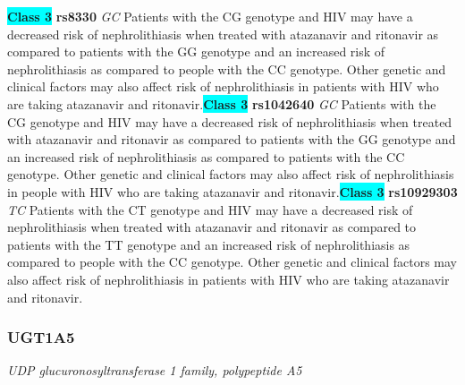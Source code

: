 \documentclass{report}
\begin{document}
\textbf{\colorbox{cyan} {Class 3}} \textbf{ rs8330 } \textit{ GC }
Patients with the CG genotype and HIV may have a decreased risk of nephrolithiasis when treated with atazanavir and ritonavir as compared to patients with the GG genotype and an increased risk of nephrolithiasis as compared to people with the CC genotype. Other genetic and clinical factors may also affect risk of nephrolithiasis in patients with HIV who are taking atazanavir and ritonavir.\newline\textbf{\colorbox{cyan} {Class 3}} \textbf{ rs1042640 } \textit{ GC }
Patients with the CG genotype and HIV may have a decreased risk of nephrolithiasis when treated with atazanavir and ritonavir as compared to patients with the GG genotype and an increased risk of nephrolithiasis as compared to patients with the CC genotype. Other genetic and clinical factors may also affect risk of nephrolithiasis in people with HIV who are taking atazanavir and ritonavir.\newline\textbf{\colorbox{cyan} {Class 3}} \textbf{ rs10929303 } \textit{ TC }
Patients with the CT genotype and HIV may have a decreased risk of nephrolithiasis when treated with atazanavir and ritonavir as compared to patients with the TT genotype and an increased risk of nephrolithiasis as compared to people with the CC genotype. Other genetic and clinical factors may also affect risk of nephrolithiasis in patients with HIV who are taking atazanavir and ritonavir. \newline\subsubsection{ UGT1A5 }
\textit{ UDP glucuronosyltransferase 1 family, polypeptide A5 }
\end{document}

